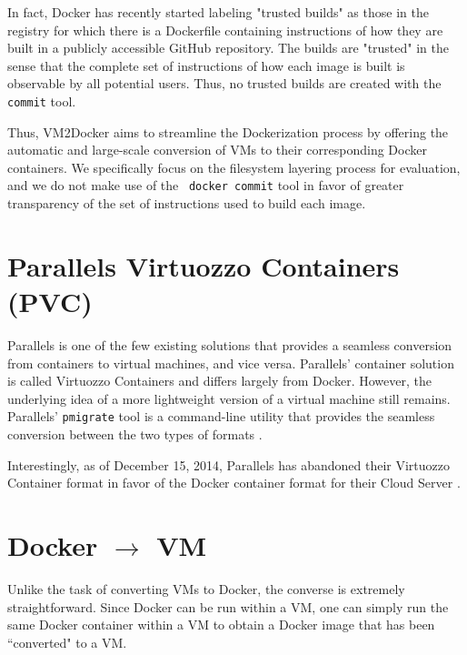 In fact, Docker has recently started labeling "trusted builds" as those in the registry for which there is a Dockerfile containing instructions of how they are built in a publicly accessible GitHub repository. The builds are "trusted" in the sense that the complete set of instructions of how each image is built is observable by all potential users. Thus, no trusted builds are created with the \texttt{commit} tool.

Thus, VM2Docker aims to streamline the Dockerization process by offering the automatic and large-scale conversion of VMs to their corresponding Docker containers. We specifically focus on the filesystem layering process for evaluation, and we do not make use of the ~\texttt{docker commit} tool in favor of greater transparency of the set of instructions used to build each image.

\section{Parallels Virtuozzo Containers (PVC)}
\label{sec:pvc}
Parallels is one of the few existing solutions that provides a seamless conversion from containers to virtual machines, and vice versa. Parallels' container solution is called Virtuozzo Containers and differs largely from Docker. However, the underlying idea of a more lightweight version of a virtual machine still remains. Parallels' \texttt{pmigrate} tool is a command-line utility that provides the seamless conversion between the two types of formats \cite{pvc}.

Interestingly, as of December 15, 2014, Parallels has abandoned their Virtuozzo Container format in favor of the Docker container format for their Cloud Server \cite{pvcloses}.


\section{Docker $\to$ VM}
\label{sec:dtovm}
Unlike the task of converting VMs to Docker, the converse is extremely straightforward. Since Docker can be run within a VM, one can simply run the same Docker container within a VM to obtain a Docker image that has been ``converted" to a VM.